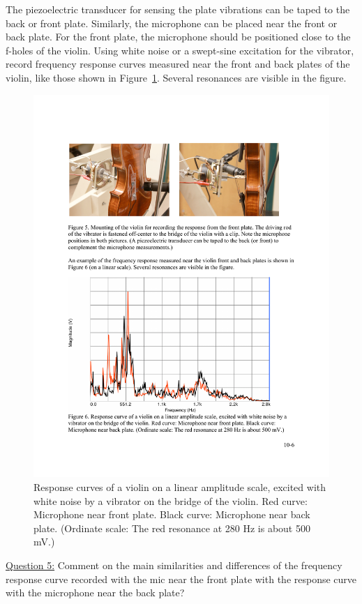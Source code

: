 \documentclass[11pt]{NSF}
\begin{document}
The piezoelectric transducer for sensing the plate vibrations can be
taped to the back or front plate.
Similarly, the microphone can be placed near the front or
back plate. 
For the front plate, the microphone should be positioned close to 
the f-holes of the violin. 
Using white noise or a swept-sine excitation for the vibrator, 
record frequency response curves measured 
near the front and back plates of the violin, like those 
shown in Figure~\ref{f:6}.
Several resonances are visible in the figure.
%
\begin{figure}[hbtp]
\begin{center}
\includegraphics[width=.7\textwidth]{fig10_6}
\caption{Response curves of a violin on a linear amplitude scale,
excited with white noise by a vibrator on the bridge of the violin.
Red curve: Microphone near front plate. Black curve: Microphone near
back plate. (Ordinate scale: The red resonance at 280 Hz is about 500
mV.)}
\label{f:6}
\end{center}
\end{figure}
%

\underline{Question 5:}
Comment on the main similarities and differences of the frequency
response curve recorded with the mic near the front plate with the response curve with the microphone near the back plate?
\\
\\
\\
\\
\end{document}
